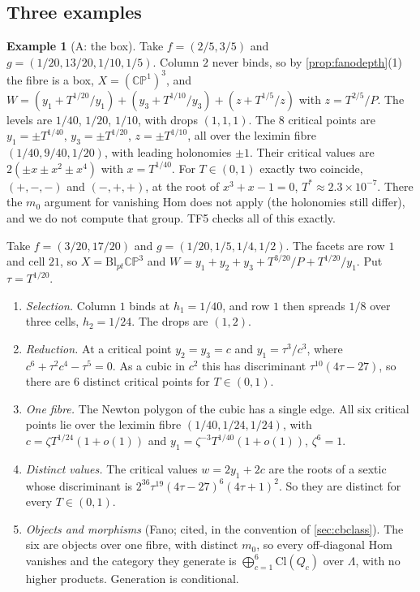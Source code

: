 \documentclass[11pt]{article}
\theoremstyle{definition}\newtheorem{definition}[theorem]{Definition}\newtheorem{remark}[theorem]{Remark}\newtheorem{example}[theorem]{Example}\newtheorem{problem}[theorem]{Open problem}\crefname{problem}{Problem}{Problems}
\begin{document}
\subsection{Three examples}
\begin{example}[A: the box]\label{ex:A24}
Take $f=(2/5,3/5)$ and $g=(1/20,13/20,1/10,1/5)$. Column $2$ never binds, so by \cref{prop:fanodepth}(1) the fibre is a box, $X=(\mathbb{CP}^1)^3$, and $W=(y_1+T^{1/20}/y_1)+(y_3+T^{1/10}/y_3)+(z+T^{1/5}/z)$
with $z=T^{2/5}/P$. The levels are $1/40$, $1/20$, $1/10$, with drops $(1,1,1)$. The $8$ critical points are $y_1=\pm T^{1/40}$, $y_3=\pm T^{1/20}$, $z=\pm T^{1/10}$, all over the leximin fibre
$(1/40,9/40,1/20)$, with leading holonomies $\pm1$. Their critical values are $2(\pm x\pm x^2\pm x^4)$ with $x=T^{1/40}$. For $T\in(0,1)$ exactly two coincide, $(+,-,-)$ and $(-,+,+)$, at the root of
$x^3+x-1=0$, $T^*\approx2.3\times10^{-7}$. There the $m_0$ argument for vanishing Hom does not apply (the holonomies still differ), and we do not compute that group. TF5 checks all of this exactly.
\end{example}

\begin{proposition}\label{prop:B24}
Take $f=(3/20,17/20)$ and $g=(1/20,1/5,1/4,1/2)$. The facets are row $1$ and cell $21$, so $X=\mathrm{Bl}_{pt}\mathbb{CP}^3$ and $W=y_1+y_2+y_3+T^{3/20}/P+T^{1/20}/y_1$. Put $\tau=T^{1/20}$.
\begin{enumerate}
\item[(1)] \emph{Selection.} Column $1$ binds at $h_1=1/40$, and row $1$ then spreads $1/8$ over three cells, $h_2=1/24$. The drops are $(1,2)$.
\item[(2)] \emph{Reduction.} At a critical point $y_2=y_3=c$ and $y_1=\tau^3/c^3$, where $c^6+\tau^2c^4-\tau^5=0$. As a cubic in $c^2$ this has discriminant $\tau^{10}(4\tau-27)$, so there are $6$ distinct
critical points for $T\in(0,1)$.
\item[(3)] \emph{One fibre.} The Newton polygon of the cubic has a single edge. All six critical points lie over the leximin fibre $(1/40,1/24,1/24)$, with $c=\zeta T^{1/24}(1+o(1))$ and
$y_1=\zeta^{-3}T^{1/40}(1+o(1))$, $\zeta^6=1$.
\item[(4)] \emph{Distinct values.} The critical values $w=2y_1+2c$ are the roots of a sextic whose discriminant is $2^{36}\tau^{19}(4\tau-27)^6(4\tau+1)^2$. So they are distinct for every $T\in(0,1)$.
\item[(5)] \emph{Objects and morphisms} (Fano; cited, in the convention of \cref{sec:cbclass}). The six are objects over one fibre, with distinct $m_0$, so every off-diagonal Hom vanishes and the
category they generate is $\bigoplus_{c=1}^6\mathrm{Cl}(Q_c)$ over $\Lambda$, with no higher products. Generation is conditional.
\end{enumerate}
\end{proposition}
\end{document}
